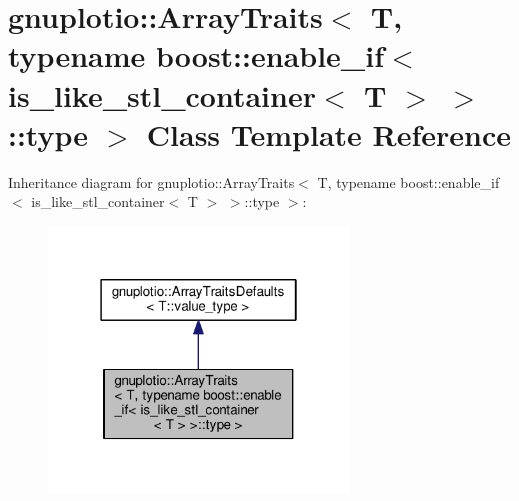 \hypertarget{classgnuplotio_1_1_array_traits_3_01_t_00_01typename_01boost_1_1enable__if_3_01is__like__stl__co9e1736bbd08cd58c6993ab613a998887}{}\section{gnuplotio\+:\+:Array\+Traits$<$ T, typename boost\+:\+:enable\+\_\+if$<$ is\+\_\+like\+\_\+stl\+\_\+container$<$ T $>$ $>$\+:\+:type $>$ Class Template Reference}
\label{classgnuplotio_1_1_array_traits_3_01_t_00_01typename_01boost_1_1enable__if_3_01is__like__stl__co9e1736bbd08cd58c6993ab613a998887}


Inheritance diagram for gnuplotio\+:\+:Array\+Traits$<$ T, typename boost\+:\+:enable\+\_\+if$<$ is\+\_\+like\+\_\+stl\+\_\+container$<$ T $>$ $>$\+:\+:type $>$\+:
\nopagebreak
\begin{figure}[H]
\begin{center}
\leavevmode
\includegraphics[width=226pt]{classgnuplotio_1_1_array_traits_3_01_t_00_01typename_01boost_1_1enable__if_3_01is__like__stl__co39a918c94e39b553da961d4c081ad747}
\end{center}
\end{figure}



